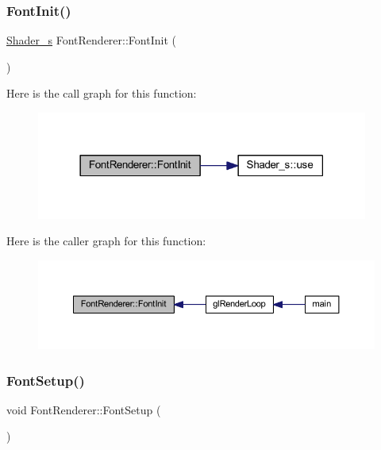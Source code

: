 \subsubsection{\texorpdfstring{Font\+Init()}{FontInit()}}
{\footnotesize\ttfamily \mbox{\hyperlink{class_shader__s}{Shader\+\_\+s}} Font\+Renderer\+::\+Font\+Init (\begin{DoxyParamCaption}{ }\end{DoxyParamCaption})}

Here is the call graph for this function\+:
\nopagebreak
\begin{figure}[H]
\begin{center}
\leavevmode
\includegraphics[width=309pt]{class_font_renderer_aa3830287fab6a8da56cde9c84aaf9032_cgraph}
\end{center}
\end{figure}
Here is the caller graph for this function\+:
\nopagebreak
\begin{figure}[H]
\begin{center}
\leavevmode
\includegraphics[width=350pt]{class_font_renderer_aa3830287fab6a8da56cde9c84aaf9032_icgraph}
\end{center}
\end{figure}
\mbox{\label{class_font_renderer_aa53dc1273b15862d310a4bc66817a5d5}} 
\subsubsection{\texorpdfstring{Font\+Setup()}{FontSetup()}}
{\footnotesize\ttfamily void Font\+Renderer\+::\+Font\+Setup (\begin{DoxyParamCaption}{ }\end{DoxyParamCaption})}

